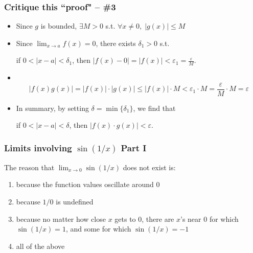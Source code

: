 \documentclass[14pt]{beamer}
\begin{document}
	\begin{frame}[t]
		\frametitle{Critique this ``proof" -- \#3}
		\fontsize{13}{13}\selectfont
		\begin{itemize}
			\item Since $g$ is bounded, $\displaystyle \exists M >0$ \; s.t. \; \;$\displaystyle
				\forall x \neq 0, \; |g(x)| \leq M$
				\vfill

			\item Since $\displaystyle \lim_{x \to a}f(x)=0$, there exists
				$\displaystyle \delta_{1}>0$ s.t.

				if $\displaystyle 0<|x-a|<\delta_{1}$, \quad then \; $\displaystyle |f(x)
				-0| = |f(x)| <\varepsilon_{1}= \frac{\varepsilon}{M}$.
				\vfill

			\item \
				\vspace{-1cm}
				\[
					|f(x)g(x)| = |f(x)| \cdot |g(x)| \leq |f(x)| \cdot M < \varepsilon_{1}\cdot
					M = \frac{\varepsilon}{M}\cdot M = \varepsilon
				\]

			\item In summary, by setting $\displaystyle \delta = \min\{\delta_{1}\}$, we
				find that

				if $\displaystyle 0<|x-a|<\delta$, \quad then \; $\displaystyle |f(x) \cdot
				g(x)| < \varepsilon$.
				\vfill
		\end{itemize}
	\end{frame}


	\begin{frame}
		\frametitle{Limits involving $\displaystyle \sin(1/x)$ Part I}

		\begin{block}{ The reason that $\displaystyle{\lim_{x\rightarrow 0}\sin (1/x)}$
		does not exist is:}
			\begin{enumerate}
				\item because the function values oscillate around $0$

				\item because $1/0$ is undefined

				\item because no matter how close $x$ gets to $0$, there are $x$'s near
					$0$ for which $\sin(1/x) =1$, and some for which $\sin (1/x)=-1$

				\item all of the above
			\end{enumerate}
		\end{block}
	\end{frame}
\end{document}
